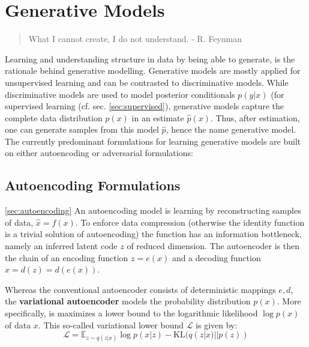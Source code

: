 \section{Generative Models}\label{sec:genmodel}
	\begin{quote}
	    What I cannot create, I do not understand. - R. Feynman
	\end{quote}
	Learning and understanding structure in data by being able to generate, is the rationale behind generative modelling.
	Generative models are mostly applied for unsupervised learning and can be contrasted to discriminative models. While discriminative models are used to model posterior conditionals $p(y|x)$ (\eg for supervised learning (cf. sec. \ref{sec:supervised}), generative models capture the complete data distribution $p(x)$ in an estimate $\hat p(x)$. Thus, after estimation, one can generate samples from this model $\hat p$, hence the name generative model.
	The currently predominant formulations for learning generative models are built on either autoencoding or adversarial formulations:

	\subsection{Autoencoding Formulations}\ref{sec:autoencoding}
		An autoencoding model is learning by reconstructing samples of data, $\hat x = f(x)$. To enforce data compression (otherwise the identity function is a trivial solution of autoencoding) the function has an information bottleneck, namely an inferred latent code $z$ of reduced dimension. The autoencoder is then the chain of an encoding function $z = e(x)$ and a decoding function $\hat x = d(z) = d(e(x))$.

		Whereas the conventional autoencoder consists of deterministic mappings $e, d$, the \textbf{variational autoencoder} models the probability distribution $p(x)$. More specifically, is maximizes a lower bound to the logarithmic likelihood $\log p(x)$ of data $x$. This so-called variational lower bound $\mathcal{L}$ is given by:
		\begin{equation}\label{eq:vae}
			\mathcal{L} = \mathds{E}_{z\sim q(z|x)}  \log p(x|z) - \textrm{KL}(q(z|x)||p(z))
		\end{equation}

